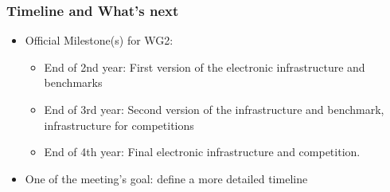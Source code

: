 \documentclass{beamer}
\begin{document}
\begin{frame}
\frametitle{Timeline and What's next}
\begin{itemize}
	\item Official Milestone(s) for WG2: 
          \begin{itemize}
          \item End of 2nd year: First version of the electronic
            infrastructure and benchmarks
          \item End of 3rd year: Second version of the infrastructure
            and benchmark, infrastructure for competitions
          \item End of 4th year: Final electronic infrastructure and
            competition.
          \end{itemize}
        \item One of the meeting's goal: define a more detailed timeline
\end{itemize}
\end{frame}
\end{document}
